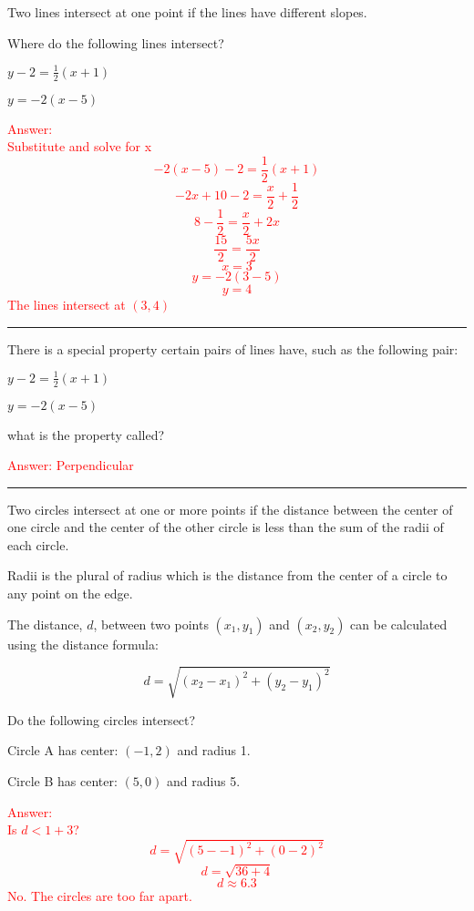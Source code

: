 \documentclass[a4paper,10pt]{article} %
\newcommand\answer[1]{ \iffoo \textcolor{red}{#1} \fi }
\let\iffoo\iffalse
\begin{document}
\LARGE


Two lines intersect at one point if the lines have different slopes.

Where do the following lines intersect?

$y-2 = \frac{1}{2}(x+1)$

$y = -2(x-5)$

\answer{Answer:\\
Substitute and solve for x
$$-2(x-5)-2 = \frac{1}{2}(x+1)$$
$$-2x+10-2 = \frac{x}{2}+\frac{1}{2}$$
$$8-\frac{1}{2} = \frac{x}{2}+2x$$
$$\frac{15}{2} = \frac{5x}{2}$$
$$x = 3$$
$$y = -2(3-5)$$
$$y = 4$$
The lines intersect at $(3,4)$}

\vspace{5cm}

\hrule

There is a special property certain pairs of lines have, such as the following pair:

$y-2 = \frac{1}{2}(x+1)$

$y = -2(x-5)$

what is the property called?

\answer{Answer: Perpendicular}

\vspace{3cm}

\hrule

Two circles intersect at one or more points if the distance between the center of one circle and the center of the other circle is less than the sum of the radii of each circle.

Radii is the plural of radius which is the distance from the center of a circle to any point on the edge.

The distance, $d$, between two points $(x_1, y_1)$ and $(x_2, y_2)$ can be calculated using the distance formula:

$$d = \sqrt{(x_2 - x_1)^2 + (y_2 - y_1)^2}$$

Do the following circles intersect?

Circle A has center: $(-1, 2)$ and radius 1.

Circle B has center: $(5, 0)$ and radius 5.

\answer{Answer:\\ 
Is $d < 1+3$?\\
$$d = \sqrt{(5--1)^2 + (0-2)^2}$$
$$d = \sqrt{36 + 4}$$
$$d \approx 6.3$$
No. The circles are too far apart.}
\end{document}
